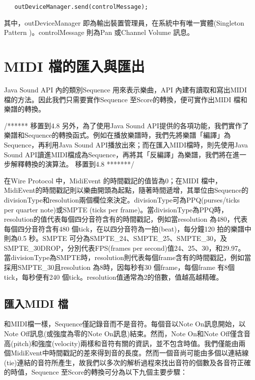 \documentclass[12pt,a4paper,oneside]{report}
\begin{document}
\begin{verbatim}
   outDeviceManager.send(controlMessage);
\end{verbatim}

其中，outDeviceManager 即為輸出裝置管理員，在系統中有唯一實體(Singleton Pattern \cite{designPatterns})。controlMessage 則為Pan 或Channel Volume 訊息。


\section{MIDI 檔的匯入與匯出} %
\label{midiImportExport}

Java Sound API 內的類別Sequence 用來表示樂曲，API 內建有讀取和寫出MIDI檔的方法。因此我們只需要實作Sequence 至Score的轉換，便可實作出MIDI 檔和樂譜的轉換。

/******  移置到4.8  
另外，為了使用Java Sound API提供的各項功能，我們實作了樂譜和Sequence的轉換函式。例如在播放樂譜時，我們先將樂譜「編譯」為Sequence，再利用Java Sound API播放出來；而在匯入MIDI檔時，則先使用Java Sound API讀進MIDI檔成為Sequence，再將其「反編譯」為樂譜，我們將在進一步解釋轉換的演算法。
移置到4.8  *******/

在Wire Protocol 中，MidiEvent 的時間戳記的值皆為0；在MIDI 檔中，MidiEvent的時間戳記則以樂曲開頭為起點，隨著時間遞增，其單位由Sequence的divisionType和resolution兩個欄位來決定。divisionType可為PPQ(purses/ticks per quarter note)或SMPTE (ticks per frame)。當divisionType為PPQ時，resolution的值代表每個四分音符含有的時間戳記，例如當resolution 為480，代表每個四分音符含有480 個tick，在以四分音符為一拍(beat)，每分鐘120 拍的樂譜中則為0.5 秒。SMPTE 可分為SMPTE\_24、SMPTE\_25、SMPTE\_30，及SMPTE\_30DROP，分別代表FPS(frames per second)值24、25、30，和29.97。當divisionType為SMPTE時，resolution則代表每個frame含有的時間戳記，例如當採用SMPTE\_30且resolution 為8時，因每秒有30 個frame，每個frame 有8個tick，每秒便有240 個tick。resolution值通常為2的倍數，值越高越精確。

\subsection{匯入MIDI 檔} %

和MIDI檔一樣，Sequence僅記錄音而不是音符。每個音以Note On訊息開始，以Note Off訊息(或強度為零的Note On訊息)結束。然而，Note On和Note Off僅含音高(pitch)和強度(velocity)兩樣和音符有關的資訊，並不包含時值。我們僅能由兩個MidiEvent中時間戳記的差來得到音的長度。然而一個音尚可能由多個以連結線(tie)連結的音符所產生，故我們以多次的解析過程來找出音符的個數及各音符正確的時值，Sequence 至Score的轉換可分為以下九個主要步驟： 
\end{document}
